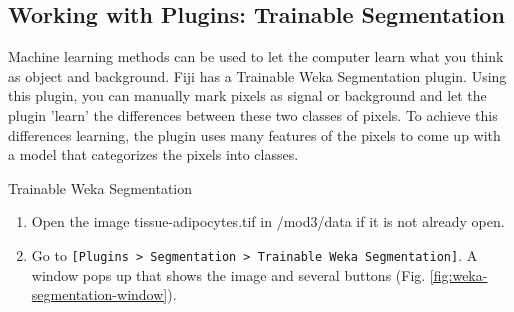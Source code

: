 \subsection{Working with Plugins: Trainable Segmentation}
Machine learning methods can be used to let the computer learn what you think as object and background. Fiji has a Trainable Weka Segmentation plugin. Using this plugin, you can manually mark pixels as signal or background and let the plugin 'learn' the differences between these two classes of pixels. To achieve this differences learning, the plugin uses many features of the pixels to come up with a model that categorizes the pixels into classes. 

\begin{taskbox}{Trainable Weka Segmentation}
\begin{enumerate}
	\item Open the image tissue-adipocytes.tif in /mod3/data if it is not already open.
	\item Go to \texttt{[Plugins > Segmentation > Trainable Weka Segmentation]}. A window pops up that shows the image and several buttons (Fig. \ref{fig:weka-segmentation-window}).
	
	\begin{minipage}[t]{\linewidth}
		\begin{center}
		\medskip
		\label{fig:weka-segmentation-window}
		\end{center}
	\end{minipage}
	

\end{enumerate}
\end{taskbox}
